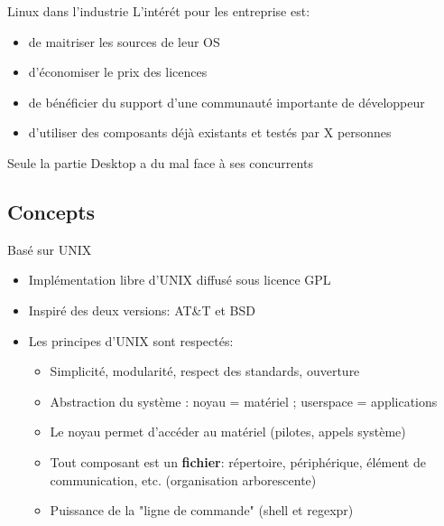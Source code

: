 \begin{frame}{Linux dans l'industrie}{}
  L'intérét pour les entreprise est:
  \begin{itemize}
  \item de maitriser les sources de leur OS
  \item d'économiser le prix des licences
  \item de bénéficier du support d'une communauté importante de développeur
  \item d'utiliser des composants déjà existants et testés par X personnes
  \end{itemize}
  Seule la partie Desktop a du mal face à ses concurrents
 \end{frame}

\subsection{Concepts}

\begin{frame}{Basé sur UNIX}{}
  \begin{itemize}
  \item Implémentation libre d'UNIX diffusé sous licence GPL
  \item Inspiré des deux versions: AT\&T et BSD
  \item Les principes d'UNIX sont respectés:
  \begin{itemize}
  \item Simplicité, modularité, respect des standards, ouverture
  \item Abstraction du système : noyau = matériel ; userspace = applications
  \item Le noyau permet d'accéder au matériel (pilotes, appels système)
  \item Tout composant est un \textbf{fichier}: répertoire, périphérique, élément de communication, etc. (organisation arborescente)
  \item Puissance de la "ligne de commande" (shell et regexpr)
  \end{itemize}
  \end{itemize}
\end{frame}

